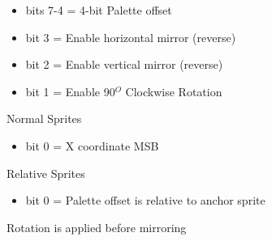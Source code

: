 \begin{itemize}
\item bits 7-4 = 4-bit Palette offset
\item bit 3 = Enable horizontal mirror (reverse)
\item bit 2 = Enable vertical mirror (reverse)
\item bit 1 = Enable 90$^O$  Clockwise Rotation
\end{itemize}
Normal Sprites
\begin{itemize}
\item bit 0 = X coordinate MSB
\end{itemize}
Relative Sprites
\begin{itemize}
\item bit 0 = Palette offset is relative to anchor sprite
\end{itemize}
Rotation is applied before mirroring

